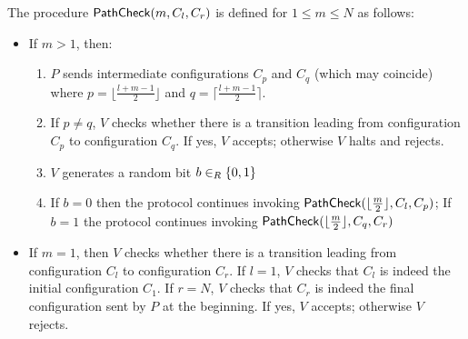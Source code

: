 \medskip
\noindent The procedure $\mathsf{PathCheck}(m, C_l, C_r)$ is defined for $1 \leq m \leq N$ as 
follows:
\begin{framed}
\begin{itemize}
    \item If $m > 1$, then:
    \begin{enumerate}
        \item $P$ sends intermediate configurations $C_{p}$ and $C_q$ (which may coincide) where $p = \lfloor \frac{l+m-1}{2} \rfloor$  and 
        $q = \lceil \frac{l+m-1}{2} \rceil$. %
        \item If $p \neq q$, $V$ checks whether there is a transition leading from configuration $C_p$ to configuration $C_q$. If yes, $V$ accepts; otherwise $V$ halts and rejects.
	\item $V$ generates a random bit $b \in_R \{0, 1\}$
        \item If  $b = 0$ then the protocol continues invoking $\mathsf{PathCheck}(\lfloor \frac{m}{2} \rfloor, C_l, C_p)$; If $b = 1$ the protocol continues invoking $\mathsf{PathCheck}(\lfloor \frac{m}{2} \rfloor, C_q, C_r)$
    \end{enumerate}
    \item If $m = 1$, then $V$ checks whether there is a transition leading from configuration $C_l$ to configuration $C_r$. If $l=1$, $V$ checks that $C_l$ is indeed the initial configuration $C_1$. If $r=N$, $V$ checks that $C_r$ is indeed the final configuration sent by $P$ at the beginning. If yes, $V$ accepts; otherwise $V$ rejects.
\end{itemize}
\end{framed}

\medskip

